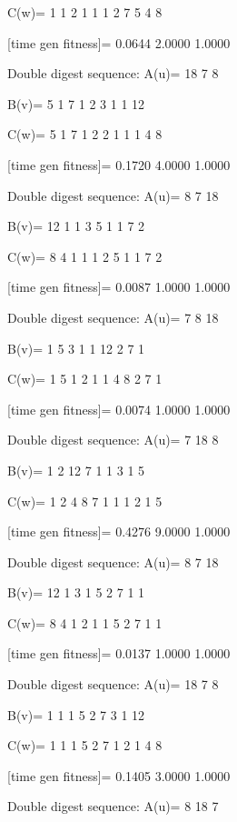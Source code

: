 C(w)=
     1     1     2     1     1     1     2     7     5     4     8

[time gen fitness]=
    0.0644    2.0000    1.0000

Double digest sequence:
A(u)=
    18     7     8

B(v)=
     5     1     7     1     2     3     1     1    12

C(w)=
     5     1     7     1     2     2     1     1     1     4     8

[time gen fitness]=
    0.1720    4.0000    1.0000

Double digest sequence:
A(u)=
     8     7    18

B(v)=
    12     1     1     3     5     1     1     7     2

C(w)=
     8     4     1     1     1     2     5     1     1     7     2

[time gen fitness]=
    0.0087    1.0000    1.0000

Double digest sequence:
A(u)=
     7     8    18

B(v)=
     1     5     3     1     1    12     2     7     1

C(w)=
     1     5     1     2     1     1     4     8     2     7     1

[time gen fitness]=
    0.0074    1.0000    1.0000

Double digest sequence:
A(u)=
     7    18     8

B(v)=
     1     2    12     7     1     1     3     1     5

C(w)=
     1     2     4     8     7     1     1     1     2     1     5

[time gen fitness]=
    0.4276    9.0000    1.0000

Double digest sequence:
A(u)=
     8     7    18

B(v)=
    12     1     3     1     5     2     7     1     1

C(w)=
     8     4     1     2     1     1     5     2     7     1     1

[time gen fitness]=
    0.0137    1.0000    1.0000

Double digest sequence:
A(u)=
    18     7     8

B(v)=
     1     1     1     5     2     7     3     1    12

C(w)=
     1     1     1     5     2     7     1     2     1     4     8

[time gen fitness]=
    0.1405    3.0000    1.0000

Double digest sequence:
A(u)=
     8    18     7

